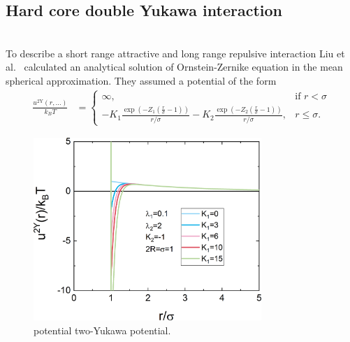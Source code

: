 \subsection{Hard core double Yukawa interaction}~\\
\label{sect:SQ4doubleYukawa}
To describe a short range attractive and long range repulsive interaction Liu et al.\ \cite{Liu2005} calculated an analytical solution of Ornstein-Zernike equation in the mean spherical approximation. They assumed a potential of the form
\begin{align}\label{eq:SQ2Ypotential}
\frac{u^\mathrm{2Y}(r,\ldots)}{k_BT} &= \begin{cases}
                             \infty, & \mbox{if }  r < \sigma \\
                             -K_1\frac{\exp\left(-Z_1 \left(\frac{r}{\sigma}-1\right)\right)}{r/\sigma} -K_2\frac{\exp\left(-Z_2 \left(\frac{r}{\sigma}-1\right)\right)}{r/\sigma}, & r\leq \sigma.
                            \end{cases}
\end{align}
\begin{figure}[htb]
\begin{center}
\includegraphics[width=0.768\textwidth]{../images/structure_factor/YukawaLike/TwoYukawaPotential.png}
\end{center}
\caption{potential two-Yukawa potential.} \label{fig:2YukawaPotential}
\end{figure}

